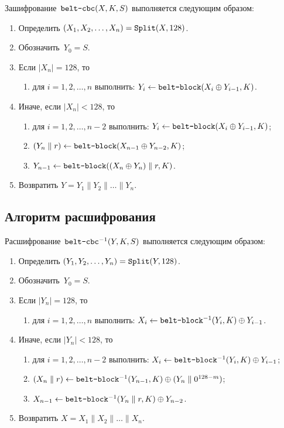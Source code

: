 Зашифрование~$\texttt{belt-cbc}(X,K,S)$ выполняется следующим образом: 
\begin{enumerate}
\item
Определить $(X_1,X_2,\ldots,X_n)=\mathop{\texttt{Split}}\nolimits(X,128)$.
\item
Обозначить~$Y_0=S$.
\item
Если $|X_n|=128$, то
\begin{enumerate}
\item
для $i=1,2,\ldots,n$ выполнить: 
$Y_i\leftarrow \texttt{belt-block}(X_i\oplus Y_{i-1},K)$.
\end{enumerate}
\item
Иначе, если $|X_n|<128$, то
\begin{enumerate}
\item
для $i=1,2,\ldots,n-2$ выполнить: 
$Y_i\leftarrow \texttt{belt-block}(X_i\oplus Y_{i-1},K)$;
\item
$(Y_n\parallel r)\leftarrow \texttt{belt-block}(X_{n-1}\oplus Y_{n-2},K)$;
\item
$Y_{n-1}\leftarrow \texttt{belt-block}((X_n\oplus Y_n)\parallel r,K)$.
\end{enumerate}
\item
Возвратить
$Y=Y_1\parallel Y_2\parallel\ldots\parallel Y_n$.
\end{enumerate}

\subsection{Алгоритм расшифрования}

Расшифрование~$\texttt{belt-cbc}^{-1}(Y,K,S)$ выполняется следующим образом: 
\begin{enumerate}
\item
Определить $(Y_1,Y_2,\ldots,Y_n)=\mathop{\texttt{Split}}\nolimits(Y,128)$.
\item
Обозначить~$Y_0=S$.
\item
Если $|Y_n|=128$, то
\begin{enumerate}
\item
для $i=1,2,\ldots,n$ выполнить: 
$X_i\leftarrow \texttt{belt-block}^{-1}(Y_i,K)\oplus Y_{i-1}$.
\end{enumerate}
\item
Иначе, если $|Y_n|<128$, то
\begin{enumerate}
\item
для $i=1,2,\ldots,n-2$ выполнить: 
$X_i\leftarrow \texttt{belt-block}^{-1}(Y_i,K)\oplus Y_{i-1}$;
\item
$(X_n\parallel r)\leftarrow \texttt{belt-block}^{-1}(Y_{n-1},K)\oplus 
(Y_n\parallel 0^{128-m})$;
\item
$X_{n-1}\leftarrow \texttt{belt-block}^{-1}(Y_n\parallel r,K)\oplus Y_{n-2}$.
\end{enumerate}
\item
Возвратить
$X=X_1\parallel X_2\parallel\ldots\parallel X_n$.
\end{enumerate}
